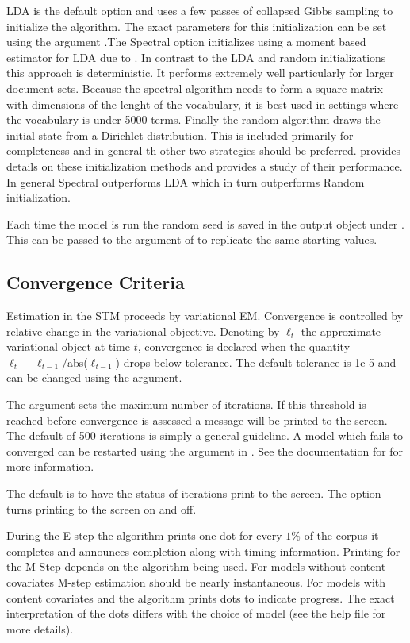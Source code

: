 \documentclass[nojss]{jss}
\begin{document}
LDA is the default option and uses a few passes of collapsed Gibbs sampling to initialize the algorithm. The exact parameters for this initialization can be set using the argument .The Spectral option initializes using a moment based estimator for LDA due to \citet{arora2012practical}. In contrast to the LDA and random initializations this approach is deterministic.  It performs extremely well particularly for larger document sets.  Because the spectral algorithm needs to form a square matrix with dimensions of the lenght of the vocabulary, it is best used in settings where the vocabulary is under 5000 terms.  Finally the random algorithm draws the initial state from a Dirichlet distribution.  This is included primarily for completeness and in general th other two strategies should be preferred.  \citet{robertsnavigating} provides details on these initialization methods and provides a study of their performance.  In general Spectral outperforms LDA which in turn outperforms Random initialization.

Each time the model is run the random seed is saved in the output object under .  This can be passed to the  argument of  to replicate the same starting values.


\subsection{Convergence Criteria}
Estimation in the STM proceeds by variational EM.  Convergence is controlled by relative change in the variational objective.  Denoting by $\ell_t$ the approximate variational object at time $t$, convergence is declared when the quantity $\ell_t - \ell_{t-1}/$abs($\ell_{t-1}$) drops below tolerance.  The default tolerance is 1e-5 and can be changed using the  argument.

The argument  sets the maximum number of iterations.  If this threshold is reached before convergence is assessed a message will be printed to the screen.  The default of 500 iterations is simply a general guideline.  A model which fails to converged can be restarted using the  argument in .  See the documentation for  for more information.

The default is to have the status of iterations print to the screen. The  option turns printing to the screen on and off.

During the E-step the algorithm prints one dot for every $1\%$ of the corpus it completes and announces completion along with timing information.  Printing for the M-Step depends on the algorithm being used.  For models without content covariates M-step estimation should be nearly instantaneous.  For models with content covariates and the algorithm prints dots to indicate progress.  The exact interpretation of the dots differs with the choice of model (see the help file for more details).
\end{document}
